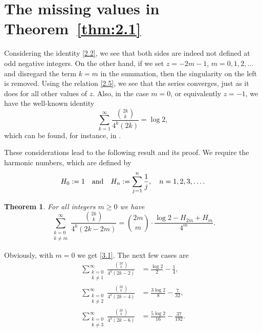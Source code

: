\documentclass{amsart}
\newtheorem{theorem}{Theorem}[section]
\theoremstyle{definition}
\theoremstyle{remark}
\numberwithin{equation}{section}
\begin{document}
\section{The missing values in Theorem~\ref{thm:2.1}}\label{sec:3}

Considering the identity \eqref{2.2}, we see that both sides are indeed not
defined at odd negative integers. On the other hand, if we set $z=-2m-1$,
$m=0, 1, 2,\ldots$ and disregard the term $k=m$ in the summation, then the 
singularity on the left is removed. Using the relation \eqref{2.5}, we 
see that the series converges, just as it does for all other values of $z$.
Also, in the case $m=0$, or equivalently $z=-1$, we have the well-known 
identity
\begin{equation}\label{3.1}
\sum_{k=1}^\infty\frac{\binom{2k}{k}}{4^k(2k)} =\log{2},
\end{equation}
which can be found, for instance, in \cite[p.~450]{Le}.

These considerations lead to the following result and its proof. We require the
harmonic numbers, which are defined by
\begin{equation}\label{3.2}
H_0:=1\quad\hbox{and}\quad H_n:=\sum_{j=1}^n\frac{1}{j},\quad n=1, 2, 3,\ldots.
\end{equation}

\begin{theorem}\label{thm:3.1}
For all integers $m\geq 0$ we have
\begin{equation}\label{3.3}
\sum_{\substack{k=0\\k\neq m}}^\infty\frac{\binom{2k}{k}}{4^k(2k-2m)}
=\binom{2m}{m}\cdot\frac{\log{2}-H_{2m}+H_m}{4^m}.
\end{equation}
\end{theorem}

Obviously, with $m=0$ we get \eqref{3.1}. The next few cases are
\begin{align*}
\sum_{\substack{k=0\\k\neq 1}}^\infty\frac{\binom{2k}{k}}{4^k(2k-2)}
&=\frac{\log{2}}{2}-\frac{1}{4},\\
\sum_{\substack{k=0\\k\neq 2}}^\infty\frac{\binom{2k}{k}}{4^k(2k-4)}
&=\frac{3\log{2}}{8}-\frac{7}{32},\\
\sum_{\substack{k=0\\k\neq 3}}^\infty\frac{\binom{2k}{k}}{4^k(2k-6)}
&=\frac{5\log{2}}{16}-\frac{37}{192}.
\end{align*}
\end{document}
